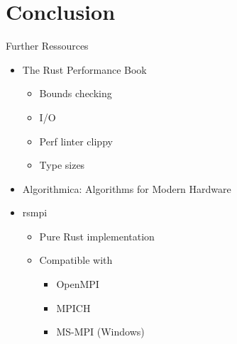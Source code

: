 \documentclass[compress,aspectratio=169]{beamer}
\begin{document}
\section{Conclusion}
\begin{frame}{Further Ressources}
  \begin{itemize}
    \item The Rust Performance Book \cite{perfbook}
      \begin{itemize}
        \item Bounds checking
        \item I/O
        \item Perf linter clippy
        \item Type sizes
      \end{itemize}
      \pause
    \item Algorithmica: Algorithms for Modern Hardware \cite{algorithmica}
      \pause
    \item rsmpi \cite{mpi}
      \begin{itemize}
        \item Pure Rust implementation
        \item Compatible with
          \begin{itemize}
            \item OpenMPI
            \item MPICH
            \item MS-MPI (Windows)
          \end{itemize}
      \end{itemize}
  \end{itemize}
\end{frame}
\end{document}
